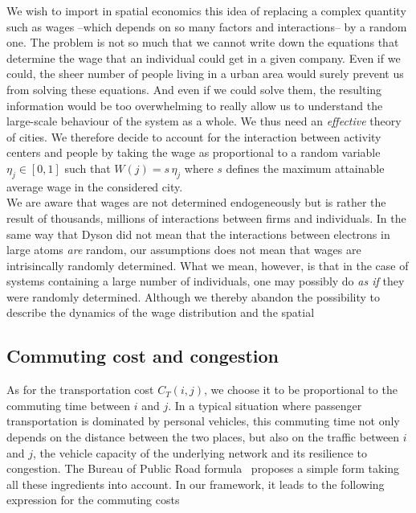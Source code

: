We wish to import in spatial economics this idea of replacing a complex quantity
such as wages --which depends on so many factors and interactions-- by a random
one. The problem is not so much that we cannot write down the equations that
determine the wage that an individual could get in a given company. Even if we
could, the sheer number of people living in a urban area would surely prevent us
from solving these equations. And even if we could solve them, the resulting
information would be too overwhelming to really allow us to understand the
large-scale behaviour of the system as a whole. We thus need an \emph{effective}
theory of cities.
We therefore decide to account for the interaction between activity centers
and people by taking the wage as proportional to a random variable $\eta_j \in
\left[ 0,1\right]$ such that $W(j) = s\, \eta_j$ where $s$ defines the maximum
attainable average wage in the considered city.\\

We are aware that wages are not determined endogeneously but is rather the
result of thousands, millions of interactions between firms and individuals. In
the same way that Dyson did not mean that the interactions between electrons in
large atoms \emph{are} random, our assumptions does not mean that wages are
intrisincally randomly determined. What we mean, however, is that in the case of
systems containing a large number of individuals, one may possibly do \emph{as
if} they were randomly determined. Although we thereby abandon the possibility
to describe the dynamics of the wage distribution and the spatial 

\subsection{Commuting cost and congestion}
\label{sub:the_commuting_cost}


As for the transportation cost $C_T(i,j)$, we choose it to be
proportional to the commuting time between $i$ and $j$. In a typical
situation where passenger transportation is dominated by personal
vehicles, this commuting time not only depends on the distance between
the two places, but also on the traffic between $i$ and $j$, the vehicle capacity of
the underlying network and its resilience to congestion. The Bureau of
Public Road formula~\cite{Branston:1976} proposes a simple form taking
all these ingredients into account. In our framework, it leads to the following expression for the 
commuting costs

